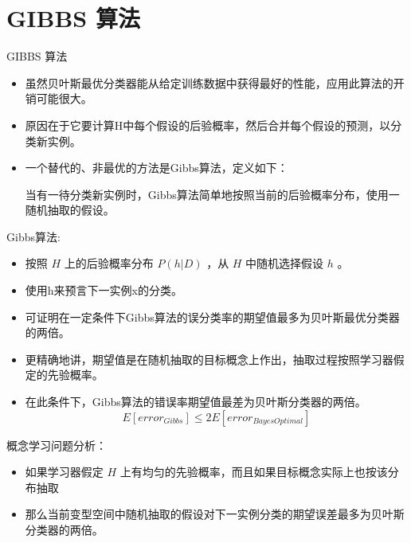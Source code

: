 \documentclass[presentation]{beamer}
\begin{document}
\section{GIBBS 算法}
\label{sec:org132920b}
\begin{frame}[label={sec:orgde89659}]{GIBBS 算法}
\begin{itemize}
\item 虽然贝叶斯最优分类器能从给定训练数据中获得最好的性能，应用此算法的开销可能很大。
\item 原因在于它要计算H中每个假设的后验概率，然后合并每个假设的预测，以分类新实例。
\item 一个替代的、非最优的方法是Gibbs算法，定义如下：

当有一待分类新实例时，Gibbs算法简单地按照当前的后验概率分布，使用一随机抽取的假设。
\end{itemize}
\end{frame}

\begin{frame}[label={sec:orgee01344}]{Gibbs算法:}
\begin{itemize}
\item 按照 \(H\) 上的后验概率分布 \(P(h|D)\) ，从 \(H\) 中随机选择假设 \(h\) 。
\item 使用h来预言下一实例x的分类。

\item 可证明在一定条件下Gibbs算法的误分类率的期望值最多为贝叶斯最优分类器的两倍。
\item 更精确地讲，期望值是在随机抽取的目标概念上作出，抽取过程按照学习器假定的先验概率。
\item 在此条件下，Gibbs算法的错误率期望值最差为贝叶斯分类器的两倍。
\[ E[error_{Gibbs}] \leq 2 E[error_{Bayes Optimal}] \]
\end{itemize}
\end{frame}

\begin{frame}[label={sec:org5f9a1d3}]{概念学习问题分析：}
\begin{itemize}
\item 如果学习器假定 \(H\) 上有均匀的先验概率，而且如果目标概念实际上也按该分布抽取
\item 那么当前变型空间中随机抽取的假设对下一实例分类的期望误差最多为贝叶斯分类器的两倍。
\end{itemize}
\end{frame}
\end{document}
